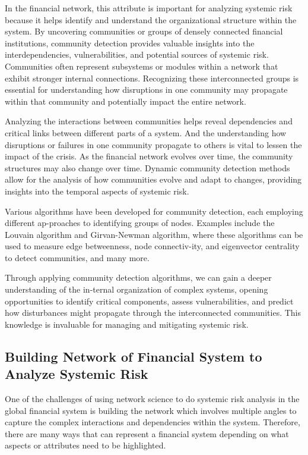 \documentclass[a4paper,11pt]{article}
\begin{document}
In the financial network, this attribute is important for analyzing systemic risk because it helps identify and understand the organizational structure within the system. By uncovering communities or groups of densely connected financial institutions, community detection provides valuable insights into the interdependencies, vulnerabilities, and potential sources of systemic risk. Communities often represent subsystems or modules within a network that exhibit stronger internal connections. Recognizing these interconnected groups is essential for understanding how disruptions in one community may propagate within that community and potentially impact the entire network.

Analyzing the interactions between communities  helps reveal dependencies and critical links between different parts of a system. And the understanding how disruptions or failures in one community propagate to others is vital to lessen the impact of the crisis. As the financial network evolves over time, the community structures may also change over time. Dynamic community detection methods allow for the analysis of how communities evolve and adapt to changes, providing insights into the temporal aspects of systemic risk.

Various algorithms have been developed for community detection, each employing different ap-proaches to identifying groups of nodes. Examples include the Louvain algorithm and Girvan-Newman algorithm, where these algorithms can be used to measure edge betweenness, node connectiv-ity, and eigenvector centrality to detect communities, and many more.

Through applying community detection algorithms, we can gain a deeper understanding of the in-ternal organization of complex systems, opening opportunities to identify critical components, assess vulnerabilities, and predict how disturbances might propagate through the interconnected communities. This knowledge is invaluable for managing and mitigating systemic risk.

\subsection{Building Network of Financial System to Analyze Systemic Risk}
One of the challenges of using network science to do systemic risk analysis in the global financial system is building the network which involves multiple angles to capture the complex interactions and dependencies within the system. Therefore, there are many ways that can represent a financial system depending on what aspects or attributes need to be highlighted.
\end{document}
